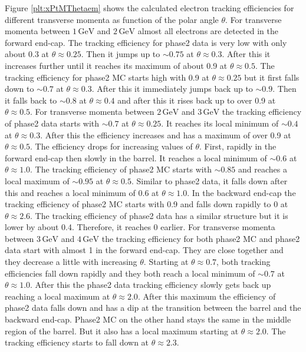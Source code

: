 \documentclass[a4paper,11pt,twosided,final,german,openbib,pdftex,listof=totoc,bibliography=totoc]{scrbook}
\begin{document}
Figure \ref{plt:xPtMThetaem} shows the calculated electron tracking efficiencies for different transverse momenta as function of the polar angle $\theta$. For transverse momenta between $1\,\textrm{GeV}$ and $2\,\textrm{GeV}$ almost all electrons are detected in the forward end-cap.  The tracking efficiency for phase2 data is very low with only about 0.3 at $\theta \approx 0.25$. Then it jumps up to $\sim 0.75$ at $\theta \approx 0.3$. After this it increases further until it reaches its maximum of about 0.9 at $\theta \approx 0.5$. The tracking efficiency for phase2 MC starts high with 0.9 at $\theta \approx 0.25$ but it first falls down to $\sim 0.7$ at $\theta \approx 0.3$. After this it immediately jumps back up to $\sim 0.9$. Then it falls back to $\sim 0.8$ at $\theta \approx 0.4$ and after this it rises back up to over 0.9 at $\theta \approx 0.5$.
For transverse momenta between $2\,\textrm{GeV}$ and $3\,\textrm{GeV}$ the tracking efficiency of phase2 data starts with $\sim 0.7$ at $\theta \approx 0.25$. It reaches its local minimum of $\sim 0.4$ at $\theta \approx 0.3$. After this the efficiency increases and has a maximum of over 0.9 at $\theta \approx 0.5$. The efficiency drops for increasing values of $\theta$. First, rapidly in the forward end-cap then slowly in the barrel. It reaches a local minimum of $\sim 0.6$ at $\theta \approx 1.0$. The tracking efficiency of phase2 MC starts with $\sim  0.85$ and reaches a local maximum of $\sim 0.95$ at $\theta \approx 0.5$. Similar to phase2 data, it falls down after this and reaches a local minimum of 0.6 at $\theta \approx 1.0$. In the backward end-cap the tracking efficiency of phase2 MC starts with 0.9 and falls down rapidly to 0 at $\theta \approx 2.6$. The tracking efficiency of phase2 data has a similar structure but it is lower by about 0.4. Therefore, it reaches 0 earlier.
For transverse momenta between $3\,\textrm{GeV}$ and $4\,\textrm{GeV}$ the tracking efficiency for both phase2 MC and phase2 data start with almost 1 in the forward end-cap. They are close together and they decrease a little with increasing $\theta$. Starting at $\theta \approx 0.7$, both tracking efficiencies fall down rapidly and they both reach a local minimum of $\sim 0.7$ at $\theta \approx 1.0$. After this the phase2 data tracking efficiency slowly gets back up reaching a local maximum at $\theta \approx 2.0$. After this maximum the efficiency of phase2 data falls down and has a dip at the transition between the barrel and the backward end-cap. Phase2 MC on the other hand stays the same in the middle region of the barrel. But it also has a local maximum starting at $\theta \approx 2.0$. The tracking efficiency starts to fall down at $\theta \approx 2.3$.
\end{document}
